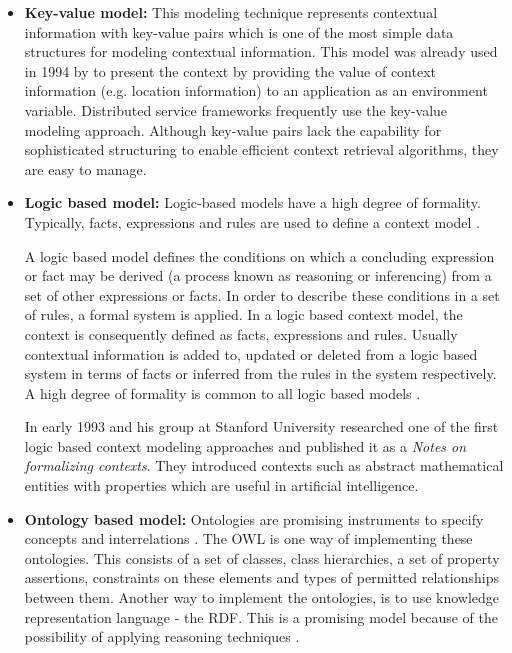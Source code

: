 \begin{itemize}
\item \textbf{Key-value model:}  This modeling technique represents contextual information with key-value pairs which is one of the most simple data structures for modeling contextual information. This model was already used in 1994 by \citeauthor{ieee512740} to present the context by providing the value of context information (e.g. location information) to an application as an environment variable. Distributed service frameworks  frequently use the key-value modeling approach. Although key-value pairs lack the capability for sophisticated structuring to enable efficient context retrieval algorithms, they are easy to manage.

\item \textbf{Logic based model: } Logic-based models have a high degree of formality. Typically, facts, expressions and rules are used to define a context model \cite{BaldaufDustdarRosenberg07ijahuc}.

A logic based model defines the conditions on which a concluding expression or fact may be derived (a process known as reasoning or inferencing) from a set of other expressions or facts. In order to describe these conditions in a set of rules, a formal system is applied. In a logic based context model, the context is consequently defined as facts, expressions and rules. Usually contextual information is added to, updated or deleted from a logic based system in terms of facts or inferred from the rules in the system respectively. A high degree of formality is common to all logic based models \cite{Strang2004}.

In early 1993 \citeauthor{McCarthy1993Notes} and his group at Stanford University researched one of the first logic based context modeling approaches and published it as a \textit{Notes on formalizing contexts}. They introduced contexts such as abstract mathematical entities with properties which are useful in artificial intelligence.


\item \textbf{Ontology based model: }
Ontologies are promising instruments to specify concepts and interrelations \cite{gruber_1993}. The \ac{OWL} is one way of implementing these ontologies. This consists of a set of classes, class hierarchies, a set of property assertions, constraints on these elements and types of permitted relationships between them. Another way to implement the ontologies, is to use knowledge representation language - the \ac{RDF}. This is a promising model because of the possibility of applying reasoning techniques \cite{Riva04}.  


\end{itemize}

